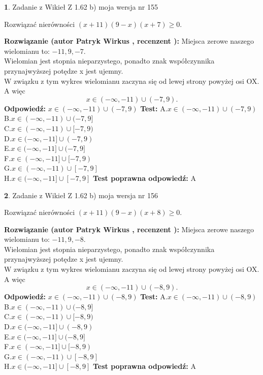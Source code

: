 \documentclass[12pt, a4paper]{article}
\theoremstyle{definition} %
\newtheorem{zad}{}
\newcommand{\zadStart}[1]{\begin{zad}#1\newline}
\newcommand{\zadStop}{\end{zad}}
\newcommand{\rozwStart}[2]{\noindent \textbf{Rozwiązanie (autor #1 , recenzent #2): }\newline}
\newcommand{\rozwStop}{\newline}
\newcommand{\odpStart}{\noindent \textbf{Odpowiedź:}\newline}
\newcommand{\odpStop}{\newline}
\newcommand{\testStart}{\noindent \textbf{Test:}\newline}
\newcommand{\testStop}{\newline}
\newcommand{\kluczStart}{\noindent \textbf{Test poprawna odpowiedź:}\newline}
\newcommand{\kluczStop}{\newline}
\begin{document}
\zadStart{Zadanie z Wikieł Z 1.62 b) moja wersja nr 155}

Rozwiązać nierówności $(x+11)(9-x)(x+7)\ge0$.
\zadStop
\rozwStart{Patryk Wirkus}{}
Miejsca zerowe naszego wielomianu to: $-11, 9, -7$.\\
Wielomian jest stopnia nieparzystego, ponadto znak współczynnika przy\linebreak najwyższej potędze x jest ujemny.\\ W związku z tym wykres wielomianu zaczyna się od lewej strony powyżej osi OX. A więc $$x \in (-\infty,-11) \cup (-7,9).$$
\rozwStop
\odpStart
$x \in (-\infty,-11) \cup (-7,9)$
\odpStop
\testStart
A.$x \in (-\infty,-11) \cup (-7,9)$\\
B.$x \in (-\infty,-11) \cup (-7,9]$\\
C.$x \in (-\infty,-11) \cup [-7,9)$\\
D.$x \in (-\infty,-11] \cup (-7,9)$\\
E.$x \in (-\infty,-11] \cup (-7,9]$\\
F.$x \in (-\infty,-11] \cup [-7,9)$\\
G.$x \in (-\infty,-11) \cup [-7,9]$\\
H.$x \in (-\infty,-11] \cup [-7,9]$
\testStop
\kluczStart
A
\kluczStop



\zadStart{Zadanie z Wikieł Z 1.62 b) moja wersja nr 156}

Rozwiązać nierówności $(x+11)(9-x)(x+8)\ge0$.
\zadStop
\rozwStart{Patryk Wirkus}{}
Miejsca zerowe naszego wielomianu to: $-11, 9, -8$.\\
Wielomian jest stopnia nieparzystego, ponadto znak współczynnika przy\linebreak najwyższej potędze x jest ujemny.\\ W związku z tym wykres wielomianu zaczyna się od lewej strony powyżej osi OX. A więc $$x \in (-\infty,-11) \cup (-8,9).$$
\rozwStop
\odpStart
$x \in (-\infty,-11) \cup (-8,9)$
\odpStop
\testStart
A.$x \in (-\infty,-11) \cup (-8,9)$\\
B.$x \in (-\infty,-11) \cup (-8,9]$\\
C.$x \in (-\infty,-11) \cup [-8,9)$\\
D.$x \in (-\infty,-11] \cup (-8,9)$\\
E.$x \in (-\infty,-11] \cup (-8,9]$\\
F.$x \in (-\infty,-11] \cup [-8,9)$\\
G.$x \in (-\infty,-11) \cup [-8,9]$\\
H.$x \in (-\infty,-11] \cup [-8,9]$
\testStop
\kluczStart
A
\kluczStop
\end{document}
